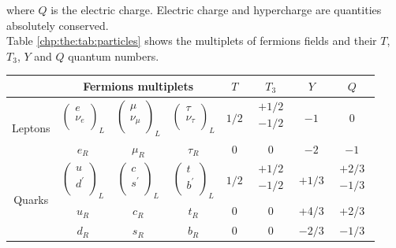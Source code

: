 \noindent where $Q$ is the electric charge. \noindent Electric charge and hypercharge are quantities absolutely conserved.\\ Table \ref{chp:the:tab:particles} shows the multiplets of fermions fields and their $T$, $T_{3}$, $Y$ and $Q$ quantum numbers.

\begin{table}[t!]
\begin{center}
  \begin{tabular}{|c||c c c||c|c|c|c|}
  \hline
  & \multicolumn{3}{c}{Fermions multiplets}&$T$&$T_{3}$&$Y$&$Q$\\
     \hline \hline
    \multirow{2}{*}{Leptons}&$\begin{pmatrix} e\\ \nu_{e}\\ \end{pmatrix}_{L}$&$\begin{pmatrix} \mu\\ \nu_{\mu}\\ \end{pmatrix}_{L}$&$\begin{pmatrix} \tau\\ \nu_{\tau}\\ \end{pmatrix}_{L}$&$1/2$&$\begin{matrix}+1/2\\-1/2\\ \end{matrix}$&$-1$&$0$\\
    &$e_{R}$&$\mu_{R}$&$\tau_{R}$&0&0&$-2$&$-1$\\
\hline
 \multirow{3}{*}{Quarks}&$\begin{pmatrix} u\\ d^{\prime}\\ \end{pmatrix}_{L}$&$\begin{pmatrix} c \\ s^{\prime}\\ \end{pmatrix}_{L}$&$\begin{pmatrix} t \\ b^{\prime}\\ \end{pmatrix}_{L}$&$1/2$&$\begin{matrix}+1/2\\-1/2\\ \end{matrix}$&$+1/3$&$\begin{matrix}+2/3\\-1/3\\ \end{matrix}$\\
    &$u_{R}$&$c_{R}$&$t_{R}$&0&0&+4/3&+2/3\\
    &$d_{R}$&$s_{R}$&$b_{R}$&0&0&$-2/3$&$-1/3$\\
  \hline
\end{tabular}


\end{center}
\end{table}
